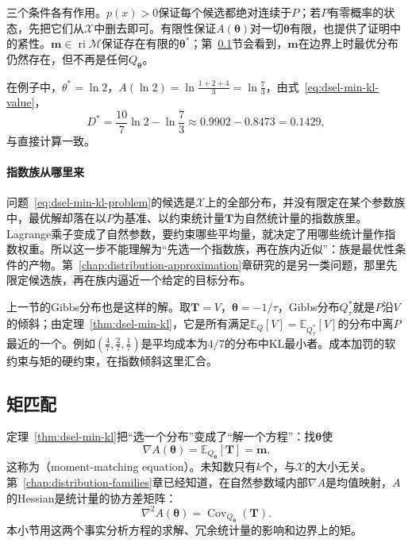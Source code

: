 三个条件各有作用。$p(x)>0$保证每个候选都绝对连续于$P$；若$P$有零概率的状态，先把它们从$\mathcal{X}$中删去即可。有限性保证$A(\bm{\theta})$对一切$\bm{\theta}$有限，也提供了证明中的紧性。$\bm{m}\in\operatorname{ri}\mathcal{M}$保证存在有限的$\bm{\theta}^{*}$；第~\ref{sec:dsel-moment-matching}节会看到，$\bm{m}$在边界上时最优分布仍然存在，但不再是任何$Q_{\bm{\theta}}$。

在例子中，$\theta^{*}=\ln2$，$A(\ln2)=\ln\frac{1+2+4}{3}=\ln\frac73$，由式~\eqref{eq:dsel-min-kl-value}，
\[
 D^{*}=\frac{10}{7}\ln2-\ln\frac73\approx0.9902-0.8473=0.1429 ,
\]
与直接计算一致。

\paragraph{指数族从哪里来}
问题~\eqref{eq:dsel-min-kl-problem}的候选是$\mathcal{X}$上的全部分布，并没有限定在某个参数族中，最优解却落在以$P$为基准、以约束统计量$\bm{T}$为自然统计量的指数族里。Lagrange乘子变成了自然参数，要约束哪些平均量，就决定了用哪些统计量作指数权重。所以这一步不能理解为“先选一个指数族，再在族内近似”：族是最优性条件的产物。第~\ref{chap:distribution-approximation}章研究的是另一类问题，那里先限定候选族，再在族内逼近一个给定的目标分布。

上一节的Gibbs分布也是这样的解。取$\bm{T}=V$，$\bm{\theta}=-1/\tau$，Gibbs分布$Q^{*}_\tau$就是$P$沿$V$的倾斜；由定理~\ref{thm:dsel-min-kl}，它是所有满足$\mathbb{E}_{Q}[V]=\mathbb{E}_{Q^{*}_\tau}[V]$的分布中离$P$最近的一个。例如$(\tfrac47,\tfrac27,\tfrac17)$是平均成本为$4/7$的分布中KL最小者。成本加罚的软约束与矩的硬约束，在指数倾斜这里汇合。

\subsection{矩匹配}
\label{sec:dsel-moment-matching}

定理~\ref{thm:dsel-min-kl}把“选一个分布”变成了“解一个方程”：找$\bm{\theta}$使
\begin{equation}
 \nabla A(\bm{\theta})=\mathbb{E}_{Q_{\bm{\theta}}}[\bm{T}]=\bm{m} .
 \label{eq:dsel-moment-matching}
\end{equation}
这称为（moment-matching equation）。未知数只有$k$个，与$\mathcal{X}$的大小无关。第~\ref{chap:distribution-families}章已经知道，在自然参数域内部$\nabla A$是均值映射，$A$的Hessian是统计量的协方差矩阵：
\[
 \nabla^{2}A(\bm{\theta})=\operatorname{Cov}_{Q_{\bm{\theta}}}(\bm{T}) .
\]
本小节用这两个事实分析方程的求解、冗余统计量的影响和边界上的矩。

